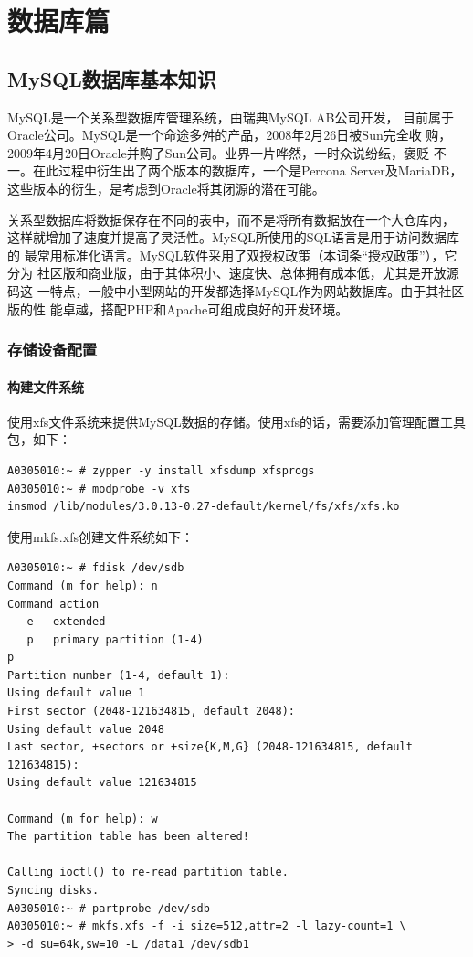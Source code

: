 \part{数据库篇}
\chapter{MySQL数据库基本知识}

MySQL是一个关系型数据库管理系统，由瑞典MySQL AB公司开发，
目前属于Oracle公司。MySQL是一个命途多舛的产品，2008年2月26日被Sun完全收
购，2009年4月20日Oracle并购了Sun公司。业界一片哗然，一时众说纷纭，褒贬
不一。在此过程中衍生出了两个版本的数据库，一个是Percona
Server及MariaDB，这些版本的衍生，是考虑到Oracle将其闭源的潜在可能。

关系型数据库将数据保存在不同的表中，而不是将所有数据放在一个大仓库内，
这样就增加了速度并提高了灵活性。MySQL所使用的SQL语言是用于访问数据库的
最常用标准化语言。MySQL软件采用了双授权政策（本词条“授权政策”），它分为
社区版和商业版，由于其体积小、速度快、总体拥有成本低，尤其是开放源码这
一特点，一般中小型网站的开发都选择MySQL作为网站数据库。由于其社区版的性
能卓越，搭配PHP和Apache可组成良好的开发环境。

\section{存储设备配置}

\subsection{构建文件系统}

使用xfs文件系统来提供MySQL数据的存储。使用xfs的话，需要添加管理配置工具
包，如下：

\begin{verbatim}
A0305010:~ # zypper -y install xfsdump xfsprogs   
A0305010:~ # modprobe -v xfs 
insmod /lib/modules/3.0.13-0.27-default/kernel/fs/xfs/xfs.ko
\end{verbatim}

使用mkfs.xfs创建文件系统如下：

\begin{verbatim}
A0305010:~ # fdisk /dev/sdb
Command (m for help): n
Command action
   e   extended
   p   primary partition (1-4)
p
Partition number (1-4, default 1): 
Using default value 1
First sector (2048-121634815, default 2048): 
Using default value 2048
Last sector, +sectors or +size{K,M,G} (2048-121634815, default 121634815): 
Using default value 121634815

Command (m for help): w
The partition table has been altered!

Calling ioctl() to re-read partition table.
Syncing disks.
A0305010:~ # partprobe /dev/sdb
A0305010:~ # mkfs.xfs -f -i size=512,attr=2 -l lazy-count=1 \
> -d su=64k,sw=10 -L /data1 /dev/sdb1
\end{verbatim}

